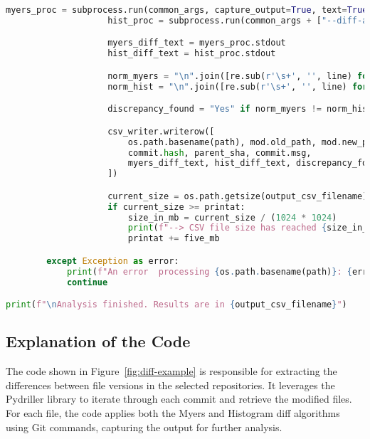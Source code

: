 \documentclass[12pt,a4paper]{article}
\begin{document}
\begin{lstlisting}[language=Python, caption={Diff analysis script for selected repositories}]
                    myers_proc = subprocess.run(common_args, capture_output=True, text=True, encoding='utf-8', errors='ignore')
                    hist_proc = subprocess.run(common_args + ["--diff-algorithm=histogram"], capture_output=True, text=True, encoding='utf-8', errors='ignore')

                    myers_diff_text = myers_proc.stdout
                    hist_diff_text = hist_proc.stdout

                    norm_myers = "\n".join([re.sub(r'\s+', '', line) for line in myers_diff_text.splitlines() if re.sub(r'\s+', '', line)])
                    norm_hist = "\n".join([re.sub(r'\s+', '', line) for line in hist_diff_text.splitlines() if re.sub(r'\s+', '', line)])

                    discrepancy_found = "Yes" if norm_myers != norm_hist else "No"

                    csv_writer.writerow([
                        os.path.basename(path), mod.old_path, mod.new_path,
                        commit.hash, parent_sha, commit.msg,
                        myers_diff_text, hist_diff_text, discrepancy_found
                    ])

                    current_size = os.path.getsize(output_csv_filename)
                    if current_size >= printat:
                        size_in_mb = current_size / (1024 * 1024)
                        print(f"--> CSV file size has reached {size_in_mb:.2f} MB.")
                        printat += five_mb

        except Exception as error:
            print(f"An error  processing {os.path.basename(path)}: {error}")
            continue

print(f"\nAnalysis finished. Results are in {output_csv_filename}")
\end{lstlisting}

\subsection*{Explanation of the Code}

The code shown in Figure~\ref{fig:diff-example} is responsible for extracting the differences between file versions in the selected repositories. It leverages the Pydriller library to iterate through each commit and retrieve the modified files. For each file, the code applies both the Myers and Histogram diff algorithms using Git commands, capturing the output for further analysis.
\end{document}
